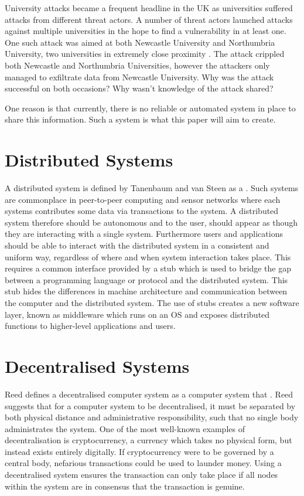 \documentclass[a4paper, 11pt]{report}
\begin{document}
University attacks became a frequent headline in the UK as universities suffered attacks from different threat actors. A number of threat actors launched attacks against multiple universities in the hope to find a vulnerability in at least one. One such attack was aimed at both Newcastle University and Northumbria University, two universities in extremely close proximity \cite{newhack,norhack}. The attack crippled both Newcastle and Northumbria Universities, however the attackers only managed to exfiltrate data from Newcastle University. Why was the attack successful on both occasions? Why wasn't knowledge of the attack shared? 

One reason is that currently, there is no reliable or automated system in place to share this information. Such a system is what this paper will aim to create. 

\section{Distributed Systems} \label{distributed}
A distributed system is defined by Tanenbaum and van Steen as a  \cite{tanenbaumdist}. Such systems are commonplace in peer-to-peer computing and sensor networks where each systems contributes some data via transactions to the system. A distributed system therefore should be autonomous and to the user, should appear as though they are interacting with a single system. Furthermore users and applications should be able to interact with the distributed system in a consistent and uniform way, regardless of where and when system interaction takes place. This requires a common interface provided by a \gls{stub} which is used to bridge the gap between a programming language or protocol and the distributed system. This \gls{stub} hides the differences in machine architecture and communication between the computer and the distributed system. The use of \gls{stub}s creates a new software layer, known as \gls{middleware} which runs on an \acrfull{OS} and exposes distributed functions to higher-level applications and users.

\section{Decentralised Systems}
Reed defines a decentralised computer system as a computer system that  \cite{namingSyncDec}. Reed suggests that for a computer system to be decentralised, it must be separated by both physical distance and administrative responsibility, such that no single body administrates the system. One of the most well-known examples of decentralisation is \gls{cryptocurrency}, a currency which takes no physical form, but instead exists entirely digitally. If cryptocurrency were to be governed by a central body, nefarious transactions could be used to launder money. Using a decentralised system ensures the transaction can only take place if all nodes within the system are in consensus that the transaction is genuine.
\end{document}
